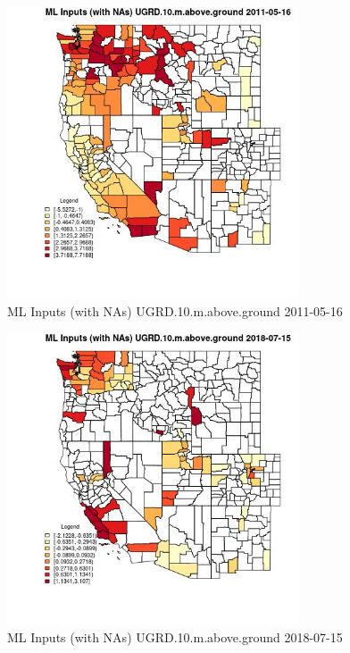 \begin{figure} 
\centering  
\includegraphics[width=0.77\textwidth]{Code_Outputs/Report_ML_input_PM25_Step4_part_e_de_duplicated_aves_compiled_2019-05-20wNAs_CountyUGRD10mabovegroundMean2011-05-16.jpg} 
\caption{\label{fig:Report_ML_input_PM25_Step4_part_e_de_duplicated_aves_compiled_2019-05-20wNAsCountyUGRD10mabovegroundMean2011-05-16}ML Inputs (with NAs) UGRD.10.m.above.ground 2011-05-16} 
\end{figure} 
 

\begin{figure} 
\centering  
\includegraphics[width=0.77\textwidth]{Code_Outputs/Report_ML_input_PM25_Step4_part_e_de_duplicated_aves_compiled_2019-05-20wNAs_CountyUGRD10mabovegroundMean2018-07-15.jpg} 
\caption{\label{fig:Report_ML_input_PM25_Step4_part_e_de_duplicated_aves_compiled_2019-05-20wNAsCountyUGRD10mabovegroundMean2018-07-15}ML Inputs (with NAs) UGRD.10.m.above.ground 2018-07-15} 
\end{figure} 
 

